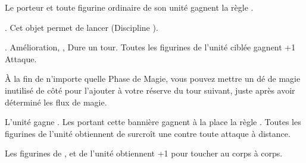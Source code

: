 \endpricelist

\armyenchanteditems

\startpricelist

 Le porteur et toute figurine ordinaire de son unité gagnent la règle \distracting{}.

\endpricelist

\armyarcaneitems

\startpricelist

 . Cet objet permet de lancer \necromancyspelltwo{} (Discipline \necromancy{}).

 . Amélioration, , Dure un tour. Toutes les figurines de l'unité ciblée gagnent +1 Attaque.

 À la fin de n'importe quelle Phase de Magie, vous pouvez mettre un dé de magie inutilisé de côté pour l'ajouter à votre réserve du tour suivant, juste après avoir déterminé les flux de magie.

\endpricelist

\armymagicalbanners

\startpricelist

 L'unité gagne \bodyguard{\vampirelord{}, \vampirehero{}}. Les \vampireknights{} portant cette bannière gagnent à la place la règle \stubborn{}. Toutes les figurines de l'unité obtiennent de surcroît une  contre toute attaque à distance. 

 Les figurines de \barrowknights{}, \barrowguards{} et \barrowkings{} de l'unité obtiennent +1 pour toucher au corps à corps.

\endpricelist

\closearmymagicalitems








\quickrefsheettitle


\bigskip
\noindent\begin{center}\Large{\textbf{}}\end{center}
\medskip

